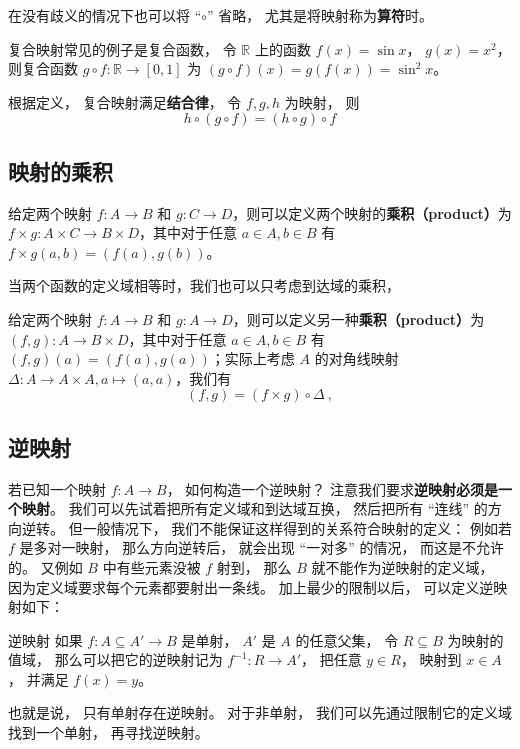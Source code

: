 在没有歧义的情况下也可以将 “$\circ$” 省略， 尤其是将映射称为\textbf{算符}时。

复合映射常见的例子是复合函数， 令 $\mathbb R$ 上的函数 $f(x) = \sin x$， $g(x) = x^2$， 则复合函数 $g\circ f: \mathbb R \to [0, 1]$ 为 $(g\circ f)(x) = g(f(x)) = \sin^2 x$。

根据定义， 复合映射满足\textbf{结合律}， 令 $f, g, h$ 为映射， 则
\begin{equation}
h \circ (g \circ f) = (h \circ g) \circ f
\end{equation}

\subsection{映射的乘积}

\begin{definition}{}
给定两个映射 $f: A \to B$ 和 $g: C \to D$，则可以定义两个映射的\textbf{乘积（product）}为 $f\times g: A \times C \to B\times D$，其中对于任意 $a\in A, b\in B$ 有 $f\times g(a, b)=(f(a), g(b))$。
\end{definition}

当两个函数的定义域相等时，我们也可以只考虑到达域的乘积，

\begin{definition}{}\label{def_map_2}
给定两个映射 $f: A \to B$ 和 $g: A \to D$，则可以定义另一种\textbf{乘积（product）}为 $(f, g): A \to B\times D$，其中对于任意 $a\in A, b\in B$ 有 $(f, g)(a)=(f(a), g(a))$；实际上考虑 $A$ 的对角线映射$\Delta: A \to A \times A, a \mapsto (a, a)$，我们有
\begin{equation}
(f, g) = (f \times g) \circ \Delta~,
\end{equation}
\end{definition}

\subsection{逆映射}
若已知一个映射 $f: A\to B$， 如何构造一个逆映射？ 注意我们要求\textbf{逆映射必须是一个映射}。 我们可以先试着把所有定义域和到达域互换， 然后把所有 “连线” 的方向逆转。 但一般情况下， 我们不能保证这样得到的关系符合映射的定义： 例如若 $f$ 是多对一映射， 那么方向逆转后， 就会出现 “一对多” 的情况， 而这是不允许的。 又例如 $B$ 中有些元素没被 $f$ 射到， 那么 $B$ 就不能作为逆映射的定义域， 因为定义域要求每个元素都要射出一条线。 加上最少的限制以后， 可以定义逆映射如下：

\begin{definition}{逆映射}
如果 $f: A\subseteq A' \to B$ 是单射， $A'$ 是 $A$ 的任意父集， 令 $R \subseteq B$ 为映射的值域， 那么可以把它的逆映射记为 $f^{-1}: R \to A'$， 把任意 $y \in R$， 映射到 $x \in A$， 并满足 $f(x) = y$。
\end{definition}
也就是说， 只有单射存在逆映射。 对于非单射， 我们可以先通过限制它的定义域找到一个单射， 再寻找逆映射。

